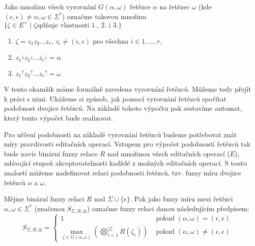 \documentclass[a4paper,10pt]{article}
\begin{document}
\begin{definition}
 Jako množinu všech vyrovnání $G(\alpha, \omega)$ řetězce $\alpha$ na řetězec $\omega$ (kde $(\epsilon, \epsilon) \neq \alpha, \omega \in \Sigma^*$) označme takovou množinu $\{ \zeta \in E^+ \mid \zeta \text{splňuje vlastnosti 1., 2. i 3.}\}$
 \begin{enumerate}
  \item $\zeta = z_1 z_2 \dots z_r$, $z_i \neq (\epsilon, \epsilon)$ pro všechna $i \in 1, \dots, r$,
  \item ${z_1}^\downarrow {z_2}^\downarrow \dots {z_r}^\downarrow = \alpha$
  \item ${z_1}^\uparrow {z_2}^\uparrow \dots {z_r}^\uparrow = \omega$
 \end{enumerate}
\end{definition}

V tento okamžik máme formálně zavedena vyrovnání řetězců. Můžeme tedy přejít k práci s nimi. Ukážeme si způsob, jak pomocí vyrovnání řetězců spočítat podobnost dvojice řetězců. Na základě tohoto výpočtu pak sestavíme automat, který tento výpočet bude realizovat.

Pro uřčení podobnosti na základě vyrovnání řetězců budeme potřebovat znát míry pravdivosti editačních operací. Vstupem pro výpočet podobnosti řetězců tak bude navíc binární fuzzy relace $R$ nad množinou všech editačních operací ($E$), udávající stupeň akceptovatelnosti kadždé z možných editačních operací. S touto znalostí můžeme nadefinovat relaci podobnosti řetězců, tzv. fuzzy míru dvojice řetězců $\alpha$ a $\omega$.


\begin{definition}\label{def-FuzzMir}
 Mějme binární fuzzy relaci $R$ nad $\Sigma \cup \{\epsilon\}$. Pak jako fuzzy míru mezi řetězci $\alpha, \omega \in \Sigma^*$ (značenou $S_{\Sigma, R, \otimes}$) označme fuzzy relaci danou následujícím předpisem:
 $$
 S_{\Sigma, R, \otimes} = 
  \begin{cases}
   1	&	\text{ pokud } (\alpha, \omega) = (\epsilon, \epsilon) \\
   \max\limits_{\zeta \in G(\alpha, \omega)} (\bigotimes_{i = 1}^{|\zeta|} R(\zeta_i) )	&	\text{ pokud } (\alpha, \omega) \neq (\epsilon, \epsilon) 
  \end{cases}
 $$
\end{definition}
\end{document}
